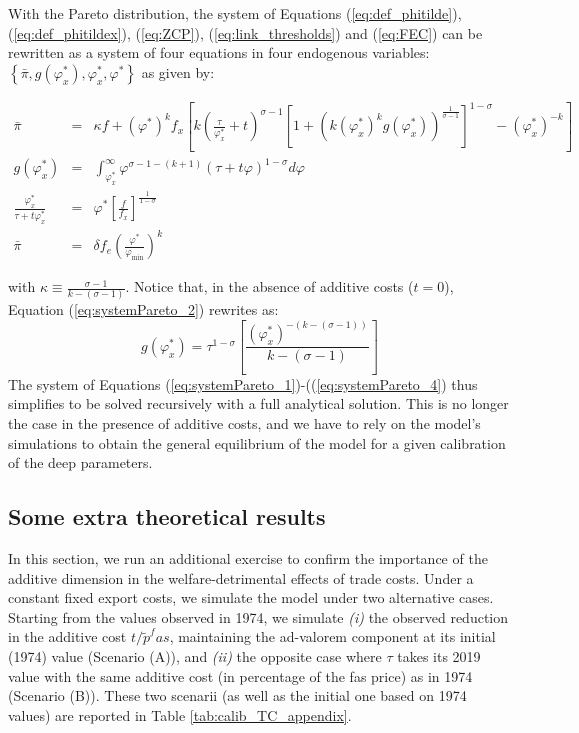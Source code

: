 \documentclass[a4paper,11pt]{article}
\begin{document}
With the Pareto distribution, the system of Equations (\ref{eq:def_phitilde}), (\ref{eq:def_phitildex}), (\ref{eq:ZCP}), (\ref{eq:link_thresholds}) and (\ref{eq:FEC}) can be rewritten as a system of four equations in four endogenous variables: $\left\{\bar{\pi}, g(\varphi_x^\ast),\varphi_x^\ast, \varphi^\ast  \right\}$ as given by:

\begin{eqnarray}
\bar{\pi}&=& \kappa f + \left(\varphi^\ast \right)^k f_x\left[k\left(\frac{\tau}{\varphi_x^\ast}+t  \right)^{\sigma-1}\left[  1+(k(\varphi_x^\ast)^k g(\varphi_x^\ast))^{\frac{1}{\sigma-1}}\right]^{1-\sigma}  - \left( \varphi_x^\ast \right)^{-k} \right] \label{eq:systemPareto_1}\\
g(\varphi_x^\ast)&=&\int_{\varphi_x^\ast}^\infty \varphi^{\sigma-1-(k+1)}(\tau +t\varphi)^{1-\sigma}d\varphi \label{eq:systemPareto_2} \\
\frac{\varphi_x^\ast}{\tau+ t\varphi_x^\ast}&=&\varphi^\ast \left[ \frac{f}{f_x} \right]^{\frac{1}{1-\sigma}} \label{eq:systemPareto_3}\\
\bar{\pi}&=& \delta f_e \left( \frac{\varphi^\ast}{\varphi_{\text{min}}} \right)^k \label{eq:systemPareto_4}
\end{eqnarray}

\noindent with $\kappa \equiv \frac{\sigma-1}{k-(\sigma-1)}$. Notice that, in the absence of additive costs ($t=0$), Equation (\ref{eq:systemPareto_2}) rewrites as:
$$g(\varphi_x^\ast) = \tau^{1-\sigma}\left[ \frac{(\varphi_x^\ast)^{-(k-(\sigma-1))}}{k-(\sigma-1)}\right]$$
The system of Equations (\ref{eq:systemPareto_1})-((\ref{eq:systemPareto_4}) thus simplifies to be solved recursively with a full analytical solution. This is no longer the case in the presence of additive costs, and we have to rely on the model's simulations to obtain the general equilibrium of the model for a given calibration of the deep parameters.


\subsection{Some extra theoretical results}

In this section, we run an additional exercise to confirm the importance of the additive dimension in the welfare-detrimental effects of trade costs. Under a constant fixed export costs, we simulate the model under two alternative cases. Starting from the values observed in 1974, we simulate \textit{(i)} the observed reduction in the additive cost $t/\widetilde{p}^fas$, maintaining the ad-valorem component at its initial (1974) value (Scenario (A)), and  \textit{(ii)} the opposite case where $\tau$ takes its 2019 value with the same additive cost (in percentage of the fas price) as in 1974 (Scenario (B)). These two scenarii (as well as the initial one based on 1974 values) are reported in Table \ref{tab:calib_TC_appendix}.
\end{document}
